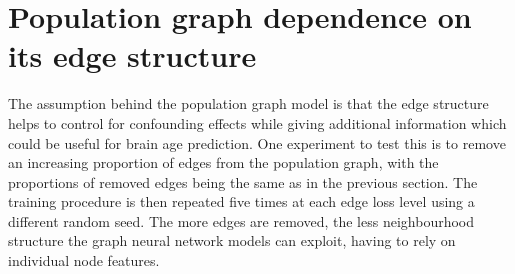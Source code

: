 \section{Population graph dependence on its edge structure}
The assumption behind the population graph model is that the edge structure helps to control for confounding effects while giving additional information which could be useful for brain age prediction. One experiment to test this is to remove an increasing proportion of edges from the population graph, with the proportions of removed edges being the same as in the previous section. The training procedure is then repeated five times at each edge loss level using a different random seed. The more edges are removed, the less neighbourhood structure the graph neural network models can exploit, having to rely on individual node features. 







